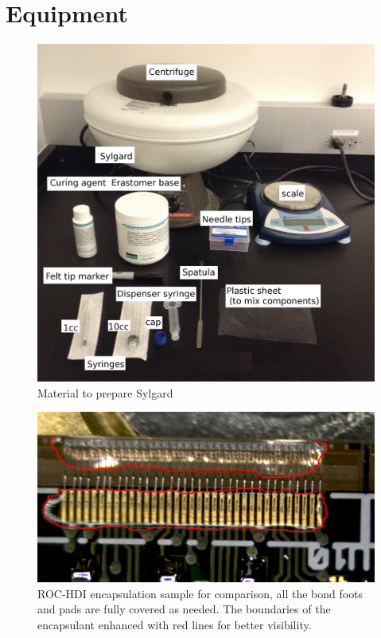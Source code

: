 \documentclass[12pt]{unlsilabsop}
\begin{document}
\section{Equipment}
\begin{figure}[h]
    \begin{center}
        \includegraphics[scale= 0.3]{img/potting_materials.jpg}
        \caption{Material to prepare Sylgard}
        \label{fig:pottingmaterial}
    \end{center}
\end{figure}

\begin{figure}[h]
  \begin{center}
    \includegraphics[width=\textwidth]{img/potting_reference.jpg}
    \caption{ROC-HDI encapsulation sample for comparison, all the bond foots and pads are fully covered as needed. The boundaries of the encapsulant enhanced with red lines for better visibility.}
    \label{fig:potting_reference}
  \end{center}
\end{figure}
\end{document}
